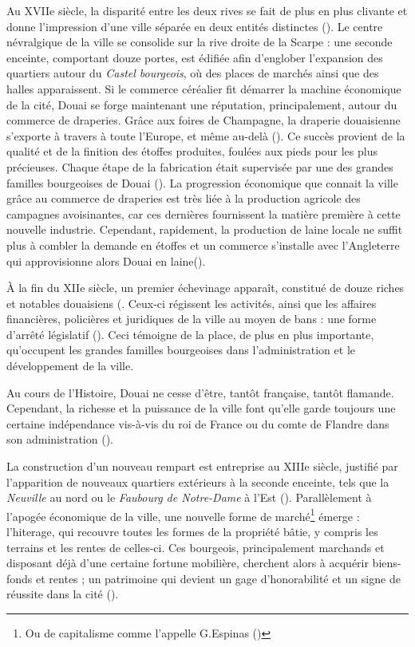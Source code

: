 Au XVIIe siècle, la disparité entre les deux rives se fait de plus en plus clivante et donne l'impression d'une ville séparée en deux entités distinctes (\cite{leroy-langelin_quartier_2012}). 
Le centre névralgique de la ville se consolide sur la rive droite de la Scarpe : une seconde enceinte, comportant douze portes, est édifiée afin d'englober l'expansion des quartiers autour du \textit{Castel bourgeois}, où des places de marchés ainsi que des halles apparaissent. 
Si le commerce céréalier fit démarrer la machine économique de la cité, Douai se forge maintenant une réputation, principalement, autour du commerce de draperies. Grâce aux foires de Champagne, la draperie douaisienne s'exporte à travers à toute l'Europe, et même au-delà (\cite{clisant_vie_2003}). Ce succès provient de la qualité et de la finition des étoffes produites, foulées aux pieds pour les plus précieuses. Chaque étape de la fabrication était supervisée par une des grandes familles bourgeoises de Douai (\cite{clisant_vie_2003}).
La progression économique que connait la ville grâce au commerce de draperies est très liée à la production agricole des campagnes avoisinantes, car ces dernières fournissent la matière première à cette nouvelle industrie.
Cependant, rapidement, la production de laine locale ne suffit plus à combler la demande en étoffes et un commerce s'installe avec l'Angleterre qui approvisionne alors Douai en laine(\cite{clisant_vie_2003}).

À la fin du XIIe siècle, un premier échevinage apparaît, constitué de douze riches et notables douaisiens (\cite{mestayer_douai_2016}. Ceux-ci régissent les activités, ainsi que les affaires financières, policières et juridiques de la ville au moyen de bans : une forme d'arrêté législatif (\cite{verriest_espinas_1914}). Ceci témoigne de la place, de plus en plus importante, qu'occupent les grandes familles bourgeoises dans l'administration et le développement de la ville.

Au cours de l'Histoire, Douai ne cesse d'être, tantôt française, tantôt flamande. Cependant, la richesse et la puissance de la ville font qu'elle garde toujours une certaine indépendance vis-à-vis du roi de France ou du comte de Flandre dans son administration (\cite{mestayer_douai_2016}).

La construction d'un nouveau rempart est entreprise au XIIIe siècle, justifié par l'apparition de nouveaux quartiers extérieurs à la seconde enceinte, tels que la \textit{Neuville} au  nord ou le \textit{Faubourg de Notre-Dame} à l'Est (\cite{netteghem_histoire_2021}).
Parallèlement à l'apogée économique de la ville, une nouvelle forme de marché\footnote{Ou de \og capitalisme \fg{} comme l'appelle G.Espinas ()} émerge : l'hiterage, qui recouvre toutes les formes de la propriété bâtie, y compris les terrains et les rentes de celles-ci. Ces bourgeois, principalement marchands et disposant déjà d'une certaine fortune mobilière, cherchent alors à acquérir biens-fonds et rentes ; un patrimoine qui devient un gage d'honorabilité et un signe de réussite dans la cité  (\cite{leguay_propriete_1989}). 


